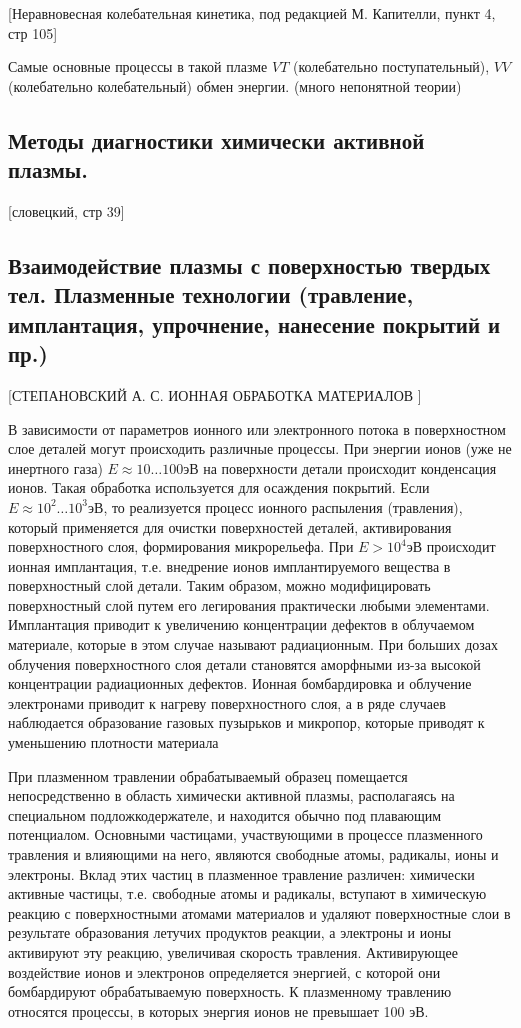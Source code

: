 \documentclass[10pt, a4paper]{article}
\begin{document}
[Неравновесная колебательная кинетика, под редакцией М. Капителли, пункт 4, стр 105]

Самые основные процессы в такой плазме $VT$ (колебательно поступательный), $VV$ (колебательно колебательный) обмен энергии. (много непонятной теории)

\subsection{Методы диагностики химически активной плазмы.}
\label{14.7} 


 [словецкий, стр 39]

\subsection{Взаимодействие плазмы с поверхностью твердых тел. Плазменные технологии (травление, имплантация, упрочнение, нанесение покрытий и пр.)}
\label{14.8}


 [СТЕПАНОВСКИЙ А. С. ИОННАЯ ОБРАБОТКА МАТЕРИАЛОВ ]


В зависимости от параметров ионного или электронного потока в поверхностном слое деталей могут происходить различные процессы. При энергии ионов (уже не инертного газа) $E \approx 10…100 эВ$ на поверхности детали происходит конденсация ионов. Такая обработка используется для осаждения покрытий. Если $E \approx 10^2…10^3 эВ$, то реализуется процесс ионного распыления (травления), который применяется для очистки поверхностей деталей, активирования поверхностного слоя, формирования микрорельефа. При $E > 10^4 эВ$ происходит ионная имплантация, т.е. внедрение ионов имплантируемого вещества в поверхностный слой детали. Таким образом, можно модифицировать поверхностный слой путем его легирования практически любыми элементами. Имплантация приводит к увеличению концентрации дефектов в облучаемом материале, которые в этом случае называют радиационным. При больших дозах облучения поверхностного слоя детали становятся аморфными из-за высокой концентрации радиационных дефектов. Ионная бомбардировка и облучение электронами приводит к нагреву поверхностного слоя, а в ряде случаев наблюдается образование газовых пузырьков и микропор, которые приводят к уменьшению плотности материала


При плазменном травлении обрабатываемый образец помещается непосредственно в область химически активной плазмы, располагаясь на специальном подложкодержателе, и
находится обычно под плавающим потенциалом. Основными частицами, участвующими в процессе плазменного травления и влияющими на него, являются свободные атомы, радикалы, ионы и электроны. Вклад этих частиц в плазменное травление различен: химически активные частицы, т.е. свободные атомы и радикалы, вступают в химическую реакцию с поверхностными атомами материалов и удаляют поверхностные слои в
результате образования летучих продуктов реакции, а электроны и ионы активируют эту реакцию, увеличивая скорость травления. Активирующее воздействие ионов и электронов
определяется энергией, с которой они бомбардируют обрабатываемую поверхность. К плазменному травлению относятся процессы, в которых энергия ионов не превышает 100 эВ.



\newpage
{}


\end{document}

